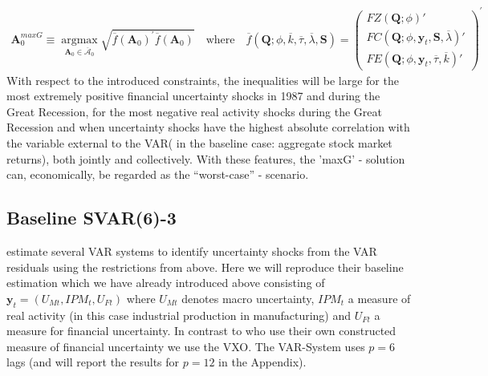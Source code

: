 \documentclass[a4paper,11pt,listof=nochaptergap,oneside,pointednumbers,bibtotoc,bigheadings,liststotoc]{scrbook}
\theoremstyle{mysatz}
\theoremstyle{mydefinition}
\theoremstyle{mybemerkung}
\newcommand{\vect}[1]{\boldsymbol{\mathbf{#1}}}
\begin{document}
\begin{equation} \label{eq:svar_ludvi16}
\begin{split}
\vect{A}_0^{maxG} \equiv \operatorname*{argmax}_{\vect{A}_0 \in \overline{\vect{\mathcal{A}}}_0} \sqrt{\overline{f}(\vect{A}_0)^'\overline{f}(\vect{A}_0)} \quad \text{where} \quad \overline{f}(\vect{Q}; \phi, \overline{k}, \overline{\tau}, \overline{\lambda}, \vect{S}) = \begin{pmatrix}
			FZ(\vect{Q}; \phi)' \\
			FC(\vect{Q}; \phi, \vect{y}_t, \vect{S}, \overline{\lambda})' \\
			FE(\vect{Q}; \phi, \vect{y}_t, \overline{\tau}, \overline{k})'	
		\end{pmatrix}^'
\end{split}								
\end{equation}
With respect to the introduced constraints, the inequalities will be large for the most extremely positive financial uncertainty shocks in 1987 and during the Great Recession, for the most negative real activity shocks during the Great Recession and when uncertainty shocks have the highest absolute correlation with the variable external to the VAR( in the baseline case: aggregate stock market returns), both jointly and collectively. With these features, the 'maxG' - solution can, economically, be regarded as the ``worst-case'' - scenario.

\subsection{Baseline SVAR(6)-3}
\citet{ludvigsonetal:18} estimate several VAR systems to identify uncertainty shocks from the VAR residuals using the restrictions from above. Here we will reproduce their baseline estimation which we have already introduced above consisting of $\vect{y}_t = (U_{Mt}, IPM_{t}, U_{Ft})$ where $U_{Mt}$ denotes macro uncertainty, $IPM_{t}$ a measure of real activity (in this case industrial production in manufacturing) and $U_{Ft}$ a measure for financial uncertainty. In contrast to \citet{ludvigsonetal:18} who use their own constructed measure of financial uncertainty we use the VXO. The VAR-System uses $p=6$ lags (and will report the results for $p=12$ in the Appendix).
\end{document}
